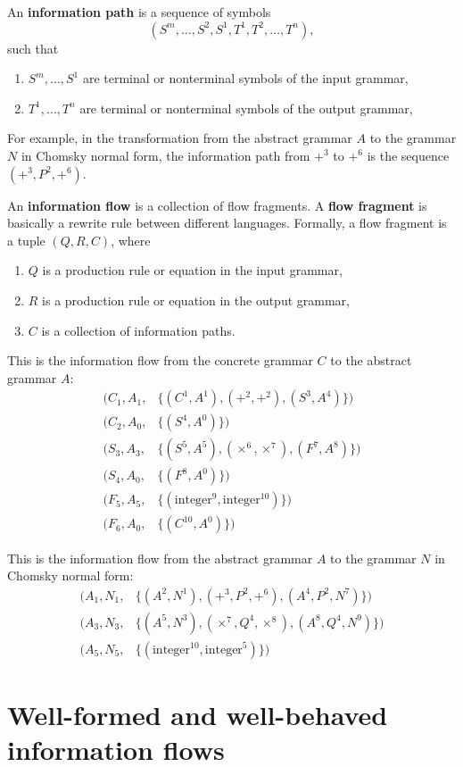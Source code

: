 \documentclass{amsart}
\begin{document}
An \textbf{information path} is a sequence of symbols
\[
(S^m,\ldots,S^2,S^1,T^1,T^2,\ldots,T^n),
\]
such that
\begin{enumerate}
\item $S^m,\ldots,S^1$ are terminal or nonterminal symbols of the
input grammar,
\item $T^1,\ldots,T^n$ are terminal or nonterminal symbols of the
output grammar,
\end{enumerate}
For example, in the transformation from the abstract grammar $A$
to the grammar $N$ in Chomsky normal form, the information path
from $+^3$ to $+^6$ is the sequence $(+^3,P^2,+^6)$.

An \textbf{information flow} is a collection of flow fragments. A
\textbf{flow fragment} is basically a rewrite rule between
different languages. Formally, a flow fragment is a tuple
$(Q,R,C)$, where
\begin{enumerate}
\item $Q$ is a production rule or equation in the input grammar,
\item $R$ is a production rule or equation in the output grammar,
\item $C$ is a collection of information paths.
\end{enumerate}

This is the information flow from the concrete grammar $C$ to the
abstract grammar $A$:
\begin{align*}
(C_1,A_1,&\{(C^1,A^1),(+^2,+^2),(S^3,A^4)\})\\
(C_2,A_0,&\{(S^4,A^0)\})\\
(S_3,A_3,&\{(S^5,A^5),(\times^6,\times^7),(F^7,A^8)\})\\
(S_4,A_0,&\{(F^8,A^0)\})\\
(F_5,A_5,&\{(\mbox{integer}^9,\mbox{integer}^{10})\})\\
(F_6,A_0,&\{(C^{10},A^0)\})
\end{align*}

This is the information flow from the abstract grammar $A$ to the
grammar $N$ in Chomsky normal form:
\begin{align*}
(A_1,N_1,&\{(A^2,N^1),(+^3,P^2,+^6),(A^4,P^2,N^7)\})\\
(A_3,N_3,&\{(A^5,N^3),(\times^7,Q^4,\times^8),(A^8,Q^4,N^9)\})\\
(A_5,N_5,&\{(\mbox{integer}^{10},\mbox{integer}^5)\})
\end{align*}


\section{Well-formed and well-behaved information flows}
\end{document}
